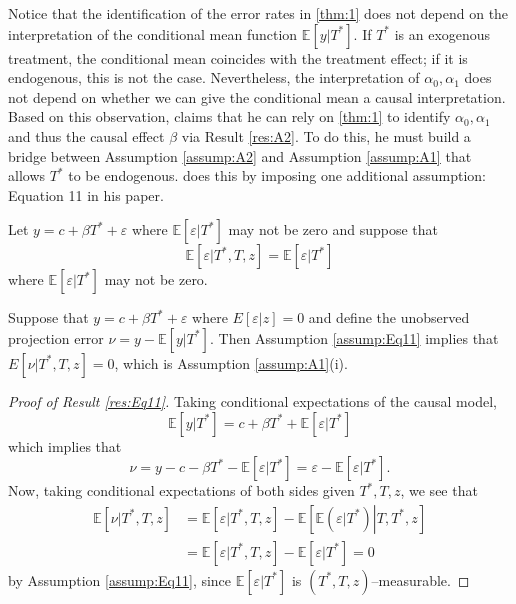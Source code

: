 Notice that the identification of the error rates in \ref{thm:1} does not depend on the interpretation of the conditional mean function $\mathbb{E}[y|T^*]$.
If $T^*$ is an exogenous treatment, the conditional mean coincides with the treatment effect; if it is endogenous, this is not the case.
Nevertheless, the interpretation of $\alpha_0, \alpha_1$ does not depend on whether we can give the conditional mean a causal interpretation.
Based on this observation, \cite{Mahajan} claims that he can rely on \ref{thm:1} to identify $\alpha_0,\alpha_1$ and thus the causal effect $\beta$ via Result \ref{res:A2}.
To do this, he must build a bridge between Assumption \ref{assump:A2} and Assumption \ref{assump:A1} that allows $T^*$ to be endogenous.
\cite{Mahajan} does this by imposing one additional assumption: Equation 11 in his paper.
\begin{assump}
  \label{assump:Eq11}
  Let $y = c + \beta T^* + \varepsilon$ where $\mathbb{E}[\varepsilon|T^*]$ may not be zero and suppose that 
  \[\mathbb{E}[\varepsilon|T^*,T,z] = \mathbb{E}[\varepsilon|T^*]\]
  where $\mathbb{E}[\varepsilon|T^*]$ may not be zero.
\end{assump}
\begin{res}
  \label{res:Eq11}
  Suppose that $y = c + \beta T^* + \varepsilon$ where $E[\varepsilon|z]=0$ and define the unobserved projection error $\nu = y - \mathbb{E}[y|T^*]$.
  Then Assumption \ref{assump:Eq11} implies that $E[\nu|T^*,T,z]=0$, which is Assumption \ref{assump:A1}(i).
\end{res}
\begin{proof}[Proof of Result \ref{res:Eq11}]
  Taking conditional expectations of the causal model,
  \[\mathbb{E}[y|T^*] = c + \beta T^* + \mathbb{E}[\varepsilon|T^*]\]
  which implies that 
  \[\nu = y - c - \beta T^* - \mathbb{E}[\varepsilon|T^*] = \varepsilon - \mathbb{E}[\varepsilon|T^*].\]
  Now, taking conditional expectations of both sides given $T^*,T,z$, we see that 
  \begin{align*}
  \mathbb{E}[\nu|T^*,T,z]&= \mathbb{E}[\varepsilon|T^*,T,z] - \mathbb{E}\left[ \mathbb{E}\left( \left.\varepsilon\right|T^* \right)\left. \right| T,T^*,z \right]\\
  &= \mathbb{E}[\varepsilon|T^*,T,z] - \mathbb{E}\left[ \left.\varepsilon\right|T^* \right] = 0
\end{align*}
by Assumption \ref{assump:Eq11}, since $\mathbb{E}[\varepsilon|T^*]$ is $(T^*,T,z)$--measurable.
\end{proof}

